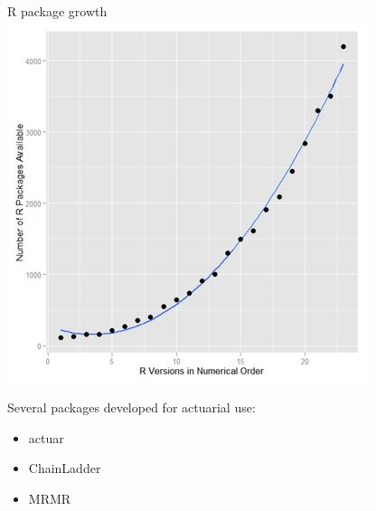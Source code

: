 \documentclass[xcolor=dvipsnames]{beamer}
\begin{document}
\begin{frame}{R package growth}
  \includegraphics[height=0.75\textheight]{figure/rPackages}
\end{frame}

\begin{frame}
Several packages developed for actuarial use:
  \begin{itemize}
    \item actuar
    \item ChainLadder
    \item MRMR
  \end{itemize}
\end{frame}
\end{document}
